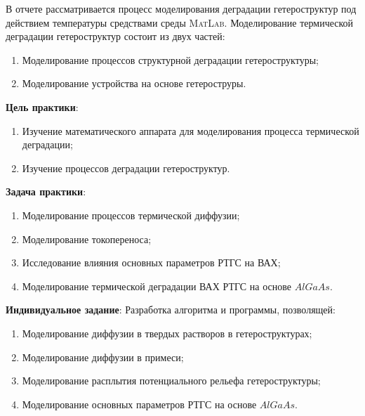 \Introduction
В отчете рассматривается процесс моделирования деградации гетероструктур под действием температуры средствами среды \textsc{MatLab}. Моделирование термической деградации гетероструктур состоит из двух частей:
\begin{enumerate}
	\item Моделирование процессов структурной деградации гетероструктуры;
	\item Моделирование устройства на основе гетероструры.
\end{enumerate}
\textbf{Цель практики}:
\begin{enumerate}
	\item Изучение математического аппарата для моделирования процесса термической деградации;
	\item Изучение процессов деградации гетероструктур.
\end{enumerate}

\textbf{Задача практики}:
\begin{enumerate}
	\item Моделирование процессов термической диффузии;
	\item Моделирование токопереноса;
	\item Исследование влияния основных параметров РТГС на ВАХ;
	\item Моделирование термической деградации ВАХ РТГС на основе $AlGaAs$.
\end{enumerate}

\textbf{Индивидуальное задание}: Разработка алгоритма и программы, позволящей:
\begin{enumerate}
	\item Моделирование диффузии в твердых растворов в гетероструктурах;
	\item Моделирование диффузии в примеси;
	\item Моделирование расплытия потенциального рельефа гетероструктуры;
	\item Моделирование основных параметров РТГС на основе $AlGaAs$.
\end{enumerate}
